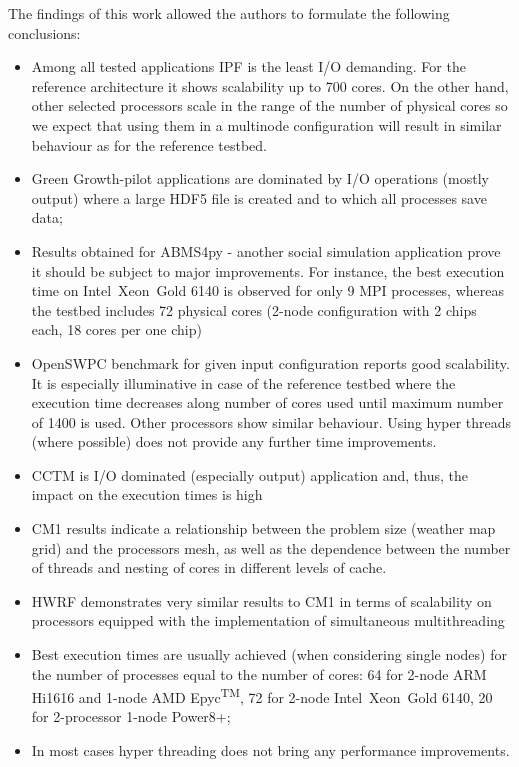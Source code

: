 The findings of this work allowed the authors to formulate the following conclusions:
\begin{itemize}
  \item[\textbullet]Among all tested applications IPF is the least I/O demanding. For the reference architecture it shows scalability up to 700 cores. On the other hand, other selected processors scale in the range of the number of physical cores so we expect that using them in a multinode configuration will result in similar behaviour as for the reference testbed.
  \item[\textbullet]Green Growth-pilot applications are dominated by I/O operations (mostly output) where a large HDF5 file is created and to which all processes save data;
  \item[\textbullet]Results obtained for ABMS4py - another social simulation application prove it should be subject to major improvements. For instance, the best execution time on Intel\textregistered\ Xeon\textregistered\ Gold 6140 is observed for only 9 MPI processes, whereas the testbed includes 72 physical cores (2-node configuration with 2 chips each, 18 cores per one chip)
  \item[\textbullet]OpenSWPC benchmark for given input configuration reports good scalability. It is especially illuminative in case of the reference testbed where the execution time decreases along number of cores used until maximum number of 1400 is used. Other processors show similar behaviour. Using hyper threads (where possible) does not provide any further time improvements.
  \item[\textbullet]CCTM is I/O dominated (especially output) application and, thus, the impact on the execution times is high
  \item[\textbullet]CM1 results indicate a relationship between the problem size (weather map grid) and the processors mesh, as well as the dependence between the number of threads and nesting of cores in different levels of cache. 
  \item[\textbullet]HWRF demonstrates very similar results to CM1 in terms of scalability on processors equipped with the implementation of simultaneous multithreading 
  \item[\textbullet]Best execution times are usually achieved (when considering single nodes) for the number of processes equal to the number of cores: 64 for 2-node ARM Hi1616 and 1-node AMD Epyc\textsuperscript{TM}, 72 for 2-node Intel\textregistered\ Xeon\textregistered\ Gold 6140, 20 for 2-processor 1-node Power8+;
  \item[\textbullet]In most cases hyper threading does not bring any performance improvements.
\end{itemize}
